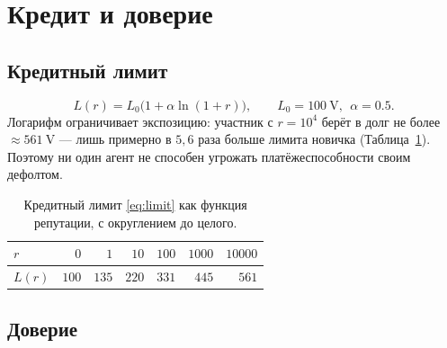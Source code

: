 \documentclass[11pt]{article}
\theoremstyle{plain}
\theoremstyle{definition}
\theoremstyle{remark}
\newcommand{\V}{\mathrm{V}}
\begin{document}
\section{Кредит и доверие}\label{sec:confidence}

\subsection{Кредитный лимит}

\begin{equation}\label{eq:limit}
L(r) = L_0\bigl(1 + \alpha \ln(1+r)\bigr), \qquad L_0 = 100~\V,\ \ \alpha = 0.5.
\end{equation}
Логарифм ограничивает экспозицию: участник с $r = 10^4$ берёт в долг не более $\approx 561~\V$ --- лишь примерно в $5{,}6$ раза больше лимита новичка (Таблица~\ref{tab:limit}). Поэтому ни один агент не способен угрожать платёжеспособности своим дефолтом.

\begin{table}[h]
\centering
\begin{tabular}{lrrrrrr}
\toprule
$r$ & $0$ & $1$ & $10$ & $100$ & $1000$ & $10000$\\
\midrule
$L(r)$ & $100$ & $135$ & $220$ & $331$ & $445$ & $561$\\
\bottomrule
\end{tabular}
\caption{Кредитный лимит \eqref{eq:limit} как функция репутации, с округлением до целого.}
\label{tab:limit}
\end{table}

\subsection{Доверие}
\end{document}
